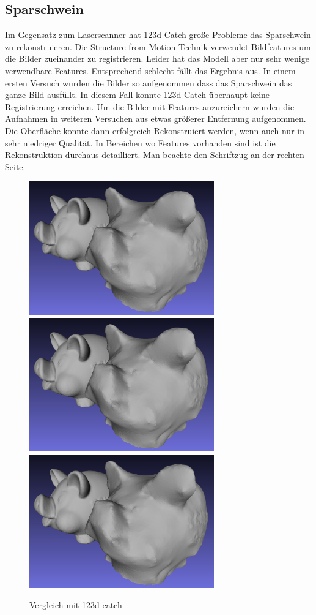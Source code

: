 \documentclass[]{article}
\begin{document}
\subsection{Sparschwein}
Im Gegensatz zum Laserscanner hat 123d Catch große Probleme das Sparschwein zu rekonstruieren. Die Structure from Motion Technik verwendet Bildfeatures um die Bilder zueinander zu registrieren. Leider hat das Modell aber nur sehr wenige verwendbare Features. Entsprechend schlecht fällt das Ergebnis aus. In einem ersten Versuch wurden die Bilder so aufgenommen dass das Sparschwein das ganze Bild ausfüllt. In diesem Fall konnte 123d Catch überhaupt keine Registrierung erreichen. Um die Bilder mit Features anzureichern wurden die Aufnahmen in weiteren Versuchen aus etwas größerer Entfernung aufgenommen. Die Oberfläche konnte dann erfolgreich Rekonstruiert werden, wenn auch nur in sehr niedriger Qualität. In Bereichen wo Features vorhanden sind ist die Rekonstruktion durchaus detailliert. Man beachte den Schriftzug an der rechten Seite.

\begin{figure}[!h]
\caption{Vergleich mit 123d catch}
\centering
\includegraphics[width=80mm]{images/sparschwein/123d_Vergleich} %
\includegraphics[width=80mm]{images/sparschwein/123d_Vergleich} %
\includegraphics[width=80mm]{images/sparschwein/123d_Vergleich}
\end{figure}
\end{document}
